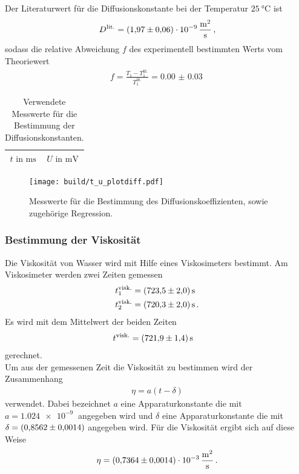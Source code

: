 Der Literaturwert \cite{wang1965self} für die Diffusionskonstante bei der Temperatur
$\SI{25}{\celsius}$ ist
\begin{align*}
  D^\text{lit.} = \SI{1.97+-0.06 e-9}{\meter\squared\per\second} \, ,
\end{align*}
sodass die relative Abweichung $f$ des experimentell bestimmten Werts
vom Theoriewert
\begin{align*}
  f = \frac{T_{1} - T_{1}^\text{lit.}}{T_{1}^\text{lit.}} = \SI{0.00(3)}{}
\end{align*}


\begin{table}
  \centering
  \caption{Verwendete Messwerte für die Bestimmung der Diffusionskonstanten.}
  \label{tab:diffusion}
  \begin{tabular}{c c}
  \toprule
  $t \text{ in } \si{\milli\second}$ & $U \text{ in } \si{\milli\volt}$\\
  \midrule
  
  \bottomrule
  \end{tabular}
\end{table}


\begin{figure}[hhh]
  \centering
  \texttt{[image: build/t\_u\_plotdiff.pdf]}
  \caption{Messwerte für die Bestimmung des Diffusionskoeffizienten, sowie zugehörige Regression.}
  \label{fig:diffusion}
\end{figure}

\FloatBarrier
\subsubsection{Bestimmung der Viskosität}
\label{subsubsec:viskositaet}
Die Viskosität von Wasser wird mit Hilfe eines Viskosimeters bestimmt.
Am Viskosimeter werden zwei Zeiten gemessen
\begin{align*}
  t_{1}^\text{visk.} &= \SI{723.5+-2}{\second}\\
  t_{2}^\text{visk.} &= \SI{720.3+-2}{\second}\, .
\end{align*}
Es wird mit dem Mittelwert der beiden Zeiten
\begin{align*}
  t^\text{visk.} &= \SI{721.9+-1.4}{\second}
\end{align*}
gerechnet.\\
Um aus der gemessenen Zeit die Viskosität zu bestimmen wird der Zusammenhang
\begin{align}
  \eta = a \left(t - \delta \right)
\end{align}
verwendet. Dabei bezeichnet $a$ eine Apparaturkonstante die mit $a = \SI{1.024e-9}{}$ angegeben wird und $\delta$
eine Apparaturkonstante die mit $\delta = \SI{0.8562+-0.0014}{}$ angegeben wird.
Für die Viskosität ergibt sich auf diese Weise
\begin{align*}
  \eta = \SI{0.7364+-0.0014 e-3}{\meter\squared\per\second} \, .
\end{align*}

